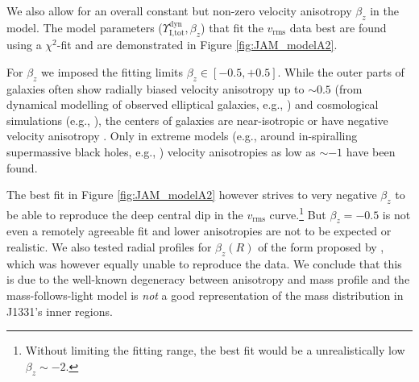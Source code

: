\documentclass[useAMS,usenatbib]{mnras}
\begin{document}
We also allow for an overall constant but non-zero velocity anisotropy $\beta_z$ in the model. The model parameters ($\Upsilon_\text{I,tot}^\text{dyn},\beta_z$) that fit the $v_\text{rms}$ data best are found using a $\chi^2$-fit and are demonstrated in Figure \ref{fig:JAM_modelA2}. 

For $\beta_z$ we imposed the fitting limits $\beta_z \in [-0.5,+0.5]$. While the outer parts of galaxies often show radially biased velocity anisotropy up to $\sim 0.5$ (from dynamical modelling of observed elliptical galaxies, e.g., \citet{Kronawitter2000}) and cosmological simulations (e.g., \citealt{2004MNRAS.352..535D,2001ApJ...557..533F}), the centers of galaxies are near-isotropic or have negative velocity anisotropy \citep{2003ApJ...583...92G}. Only in extreme models (e.g., around in-spiralling supermassive black holes, e.g., \citealt{1997NewA....2..533Q}) velocity anisotropies as low as $\sim -1$ have been found.

The best fit in Figure \ref{fig:JAM_modelA2} however strives to very negative $\beta_z$ to be able to reproduce the deep central dip in the  $v_\text{rms}$ curve.\footnote{Without limiting the fitting range, the best fit would be a unrealistically low $\beta_z \sim -2$.} But $\beta_z = -0.5$ is not even a remotely agreeable fit and lower anisotropies are not to be expected or realistic. We also tested radial profiles for $\beta_z(R)$ of the form proposed by \citet{BaesVanHese}, which was however equally unable to reproduce the data. We conclude that this is due to the well-known degeneracy between anisotropy and mass profile and the mass-follows-light model is \emph{not} a good representation of the mass distribution in J1331's inner regions.
\end{document}
